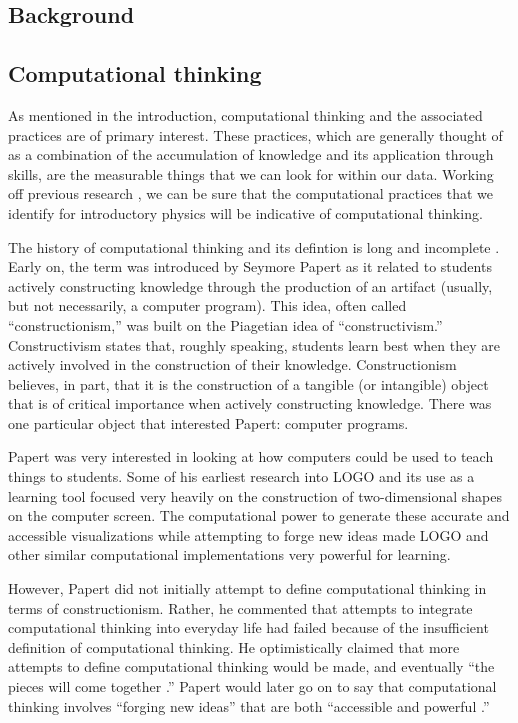 \documentclass{msuphddissertation}
\begin{document}
\begin{doublespace}
%
%

\chapter{Background}\label{CH2:Background}

\section{Computational thinking}

As mentioned in the introduction, computational thinking and the associated practices are of primary interest.  These practices, which are generally thought of as a combination of the accumulation of knowledge and its  application through skills, are the measurable things that we can look for within our data.  Working off previous research \cite{AAPT2016,NGSS2012,Weintrop2015}, we can be sure that the computational practices that we identify for introductory physics will be indicative of computational thinking.

The history of computational thinking and its defintion is long and incomplete \cite{Papert1981,Papert1996,Wing2006,Wing2008,Aho2012,Grover2013,Bundy2007}.  Early on, the term was introduced by Seymore Papert as it related to students actively constructing knowledge through the production of an artifact (usually, but not necessarily, a computer program).  This idea, often called ``constructionism,'' was built on the Piagetian idea of ``constructivism.''  Constructivism states that, roughly speaking, students learn best when they are actively involved in the construction of their knowledge.  Constructionism believes, in part, that it is the construction of a tangible (or intangible) object that is of critical importance when actively constructing knowledge.  There was one particular object that interested Papert: computer programs.

Papert was very interested in looking at how computers could be used to teach things to students.  Some of his earliest research into LOGO and its use as a learning tool focused very heavily on the construction of two-dimensional shapes on the computer screen.  The computational power to generate these accurate and accessible visualizations while attempting to forge new ideas made LOGO and other similar computational implementations very powerful for learning.
 
However, Papert did not initially attempt to define computational thinking in terms of constructionism.  Rather, he commented that attempts to integrate computational thinking into everyday life had failed because of the insufficient definition of computational thinking.  He optimistically claimed that more attempts to define computational thinking would be made, and eventually ``the pieces will come together \cite{Papert1981}.''  Papert would later go on to say that computational thinking involves ``forging new ideas'' that are both ``accessible and powerful \cite{Papert1996}.''


\end{doublespace}
\end{document}
